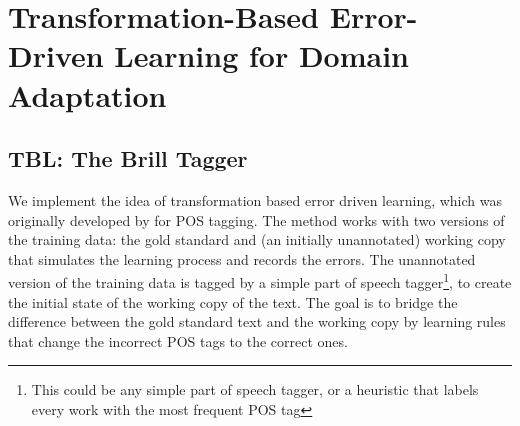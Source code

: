 \section{Transformation-Based Error-Driven Learning for Domain Adaptation} \label{sec:tbl}

\subsection{TBL: The Brill Tagger}


We implement the idea of transformation based error driven learning, which was originally developed by \citet{brill1992simple} for POS tagging. The method works with two versions of the training data: the gold standard and (an initially unannotated) working copy that simulates the learning process and records the errors. The unannotated version of the training data is tagged by a simple part of speech tagger\footnote{This could be any simple part of speech tagger, or a heuristic that labels every work with the most frequent POS tag}, to create the initial state of the working copy of the text.  The goal is to bridge the difference between the gold standard text and the working copy by learning rules that change the incorrect POS tags to the correct ones. 

